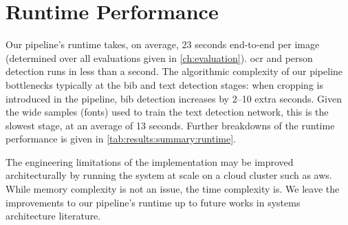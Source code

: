 \section{Runtime Performance}

Our pipeline's runtime takes, on average, 23 seconds end-to-end per image (determined over all evaluations given in \cref{ch:evaluation}). \gls{ocr} and person detection runs in less than a second. The algorithmic complexity of our pipeline bottlenecks typically at the bib and text detection stages: when cropping is introduced in the pipeline, bib detection increases by 2--10 extra seconds. Given the wide samples (fonts) used to train the text detection network, this is the slowest stage, at an average of 13 seconds. Further breakdowns of the runtime performance is given in \cref{tab:results:summary:runtime}.

The engineering limitations of the \frcnn{} implementation may be improved architecturally by running the system at scale on a cloud cluster such as \gls{aws}. While memory complexity is not an issue, the time complexity is. We leave the improvements to our pipeline's runtime up to future works in systems architecture literature.


